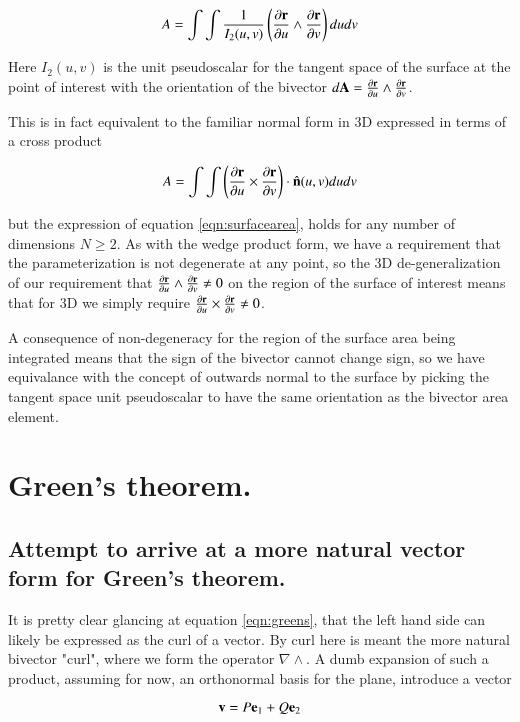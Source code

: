 \documentclass{article}
\newcommand{\grad}[0]{\nabla}
\newcommand{\PD}[2]{\frac{\partial {#2}}{\partial {#1}}}
\begin{document}
\begin{equation}\label{eqn:surfacearea}
A = \int\int \inv{I_2(u,v)} \left(\PD{u}{\Br} \wedge \PD{v}{\Br}\right) du dv
\end{equation}

Here $I_2(u,v)$ is the unit pseudoscalar for the tangent space of the surface at the point of interest with the orientation of the bivector 
$d\BA = \PD{u}{\Br} \wedge \PD{v}{\Br}$.

This is in fact equivalent to the familiar normal form in 3D expressed in terms
of a cross product

\begin{equation}
A = \int\int \left(\PD{u}{\Br} \cross \PD{v}{\Br}\right) \cdot \ncap(u,v) du dv
\end{equation}

but the expression of equation \ref{eqn:surfacearea}, holds for any number of dimensions $N \ge 2$.  As with the wedge product form, we have a requirement that the parameterization is not degenerate at any point, so the 3D de-generalization of our requirement that
$\PD{u}{\Br} \wedge \PD{v}{\Br} \ne 0$
on the region of the surface of interest means that for 3D we simply require
$\PD{u}{\Br} \cross \PD{v}{\Br} \ne 0$.

A consequence of non-degeneracy for the region of the surface area being integrated means that the sign of the bivector cannot change sign, so we have equivalance with the concept of outwards normal to the surface by picking the tangent space unit pseudoscalar to have the same orientation as the bivector area element.

\section{ Green's theorem. }

\subsection{ Attempt to arrive at a more natural vector form for Green's theorem. }

It is pretty clear glancing at equation \ref{eqn:greens}, that the left
hand side can likely be expressed as the curl of a vector.  By curl here
is meant the more natural bivector "curl", where we form the operator $\grad \wedge$.  A dumb expansion of such a product,
assuming for now, an orthonormal basis for the plane, introduce a vector

\begin{equation*}
\mathbf{v} = P \mathbf{e}_1 + Q \mathbf{e}_2
\end{equation*}
\end{document}
